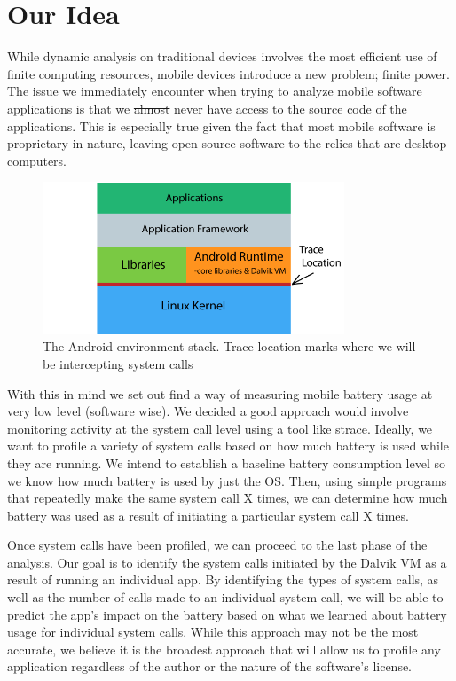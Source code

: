 \documentclass[11pt]{article}
\begin{document}
\section{Our Idea}

While dynamic analysis on traditional devices involves the most efficient use of finite 
computing resources, mobile devices introduce a new problem; finite power. The issue we 
immediately encounter when trying to analyze mobile software applications is that we 
\sout{almost} never have access to the source code of the applications. This is 
especially true given the fact that most mobile software is proprietary in nature, 
leaving open source software to the relics that are desktop computers.

\begin{figure}[h]
  \centerline{
        \includegraphics[width=90mm]{images/environment_graphic.png}
  }
  \caption{The Android environment stack. Trace location marks where we will be intercepting system calls}
  
 \end{figure}

With this in mind we set out find a way of measuring mobile battery usage at very low level
(software wise). We decided a good approach would involve monitoring activity at the system 
call level using a tool like strace. Ideally, we want to profile a variety of system calls 
based on how much battery is used while they are running. We intend to establish a baseline 
battery consumption level so we know how much battery is used by just the OS. Then, using 
simple programs that repeatedly make the same system call X times, we can determine how much 
battery was used as a result of initiating a particular system call X times.

Once system calls have been profiled, we can proceed to the last phase of the analysis. Our 
goal is to identify the system calls initiated by the Dalvik VM as a result of running an 
individual app. By identifying the types of system calls, as well as the number of calls made 
to an individual system call, we will be able to predict the app's impact on the battery based 
on what we learned about battery usage for individual system calls. While this approach may not 
be the most accurate, we believe it is the broadest approach that will allow us to profile any 
application regardless of the author or the nature of the software's license.
\end{document}
